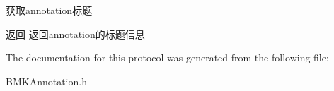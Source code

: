 获取annotation标题 \begin{DoxyReturn}{返回}
返回annotation的标题信息 
\end{DoxyReturn}


The documentation for this protocol was generated from the following file\-:\begin{DoxyCompactItemize}
\item 
B\-M\-K\-Annotation.\-h\end{DoxyCompactItemize}

